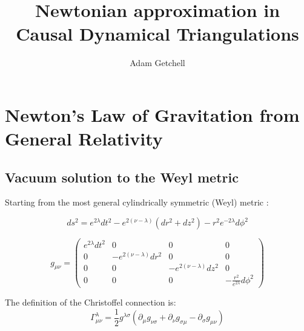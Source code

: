 \documentclass{article}
\title{Newtonian approximation in Causal Dynamical Triangulations}
\author{Adam Getchell}
\date{}
\begin{document}
\maketitle
\tableofcontents

\section{Newton's Law of Gravitation from General Relativity}

\subsection{Vacuum solution to the Weyl metric}

Starting from the most general cylindrically symmetric (Weyl) metric \cite{synge_relativity}:

\begin{equation}
ds^{2}=e^{2\lambda}dt^{2}-e^{2\left(\nu-\lambda\right)}\left(dr^{2}+dz^{2}\right)-r^{2}e^{-2\lambda}d\phi^{2}\label{eq:weyl-metric}
\end{equation}

\begin{equation}
g_{\mu\nu}=\left(\begin{array}{cccc}
e^{2\lambda}dt^{2} & 0 & 0 & 0\\
0 & -e^{2\left(\nu-\lambda\right)}dr^{2} & 0 & 0\\
0 & 0 & -e^{2\left(\nu-\lambda\right)}dz^{2} & 0\\
0 & 0 & 0 & -\frac{r^{2}}{e^{2\lambda}}d\phi^{2}
\end{array}\right)\label{eq:general-axisymmetric-static-matrix-metric}
\end{equation}

The definition of the Christoffel connection is: \cite{carroll2003spacetime} 
\begin{equation}
\Gamma_{\mu\nu}^{\lambda}=\frac{1}{2}g^{\lambda\sigma}\left(\partial_{\mu}g_{\nu\sigma}+\partial_{\nu}g_{\sigma\mu}-\partial_{\sigma}g_{\mu\nu}\right)
\end{equation}
\end{document}
